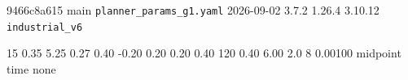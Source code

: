 %
%
%
%

\providecommand{\resdef}[2]{\expandafter\def\csname #1\endcsname{#2}}

\providecommand{\restabdir}{tab}
\providecommand{\restab}[1]{}

\resdef{resCommit}{9466c8a615} %
\resdef{resBranch}{main} %
\resdef{resProfile}{\texttt{planner\_params\_g1.yaml}} %
\resdef{resDate}{2026-09-02} %
\resdef{resCasadi}{3.7.2}
\resdef{resNumpy}{1.26.4}
\resdef{resPython}{3.10.12}
\resdef{resBag}{\texttt{industrial\_v6}} %

\resdef{resN}{15}              %
\resdef{resDt}{0.35}           %
\resdef{resHorizonSeconds}{5.25} %
\resdef{resVref}{0.27}         %
\resdef{resVxMax}{0.40}
\resdef{resVxMin}{-0.20}       %
\resdef{resVxMinAbs}{0.20}     %
\resdef{resVyMax}{0.20}
\resdef{resOmegaMax}{0.40}
\resdef{resWobsDep}{120}       %
\resdef{resObsRDep}{0.40}      %
\resdef{resAobsDep}{6.00}      %
\resdef{resObsCheckR}{2.0}     %
\resdef{resMobs}{8}            %
\resdef{resTauV}{0.00100}      %
\resdef{resIntegrator}{midpoint}
\resdef{resPathMode}{time}
\resdef{resTerminalMode}{none}

